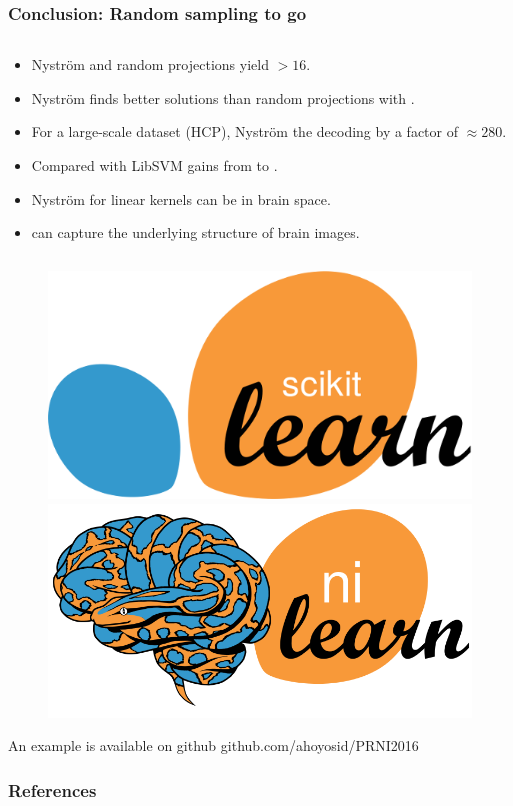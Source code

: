\documentclass{beamer}
\begin{document}
\begin{frame}\frametitle{\textbf{Conclusion:} Random sampling to go}
\begin{columns}
\begin{column}{1.1\linewidth}
\begin{block}{}
\begin{itemize}
\item Nystr\"om and random projections yield  $> 16$.
\item Nystr\"om finds better solutions than random projections with 
.
\item For a large-scale dataset (HCP), Nystr\"om  
the decoding by a factor of $\approx 280$.
\item Compared with LibSVM gains from \structure{$\mathbf{50\times}$} to 
\structure{$\mathbf{1000\times}$}.
\item Nystr\"om for linear kernels can be  
in brain space.
\item {} can capture the underlying 
structure of brain images.
\end{itemize}
\end{block}
\end{column}
\end{columns}

\begin{figure}
\includegraphics[width=0.3\linewidth]{figures/scikit-learn-logo.png}\hfill
\includegraphics[width=0.3\linewidth]{figures/nilearn-logo.png}
\end{figure}

An example is available on github \alert{github.com/ahoyosid/PRNI2016} 

\end{frame}

\begin{frame}\frametitle{References}


\end{frame}
\end{document}

